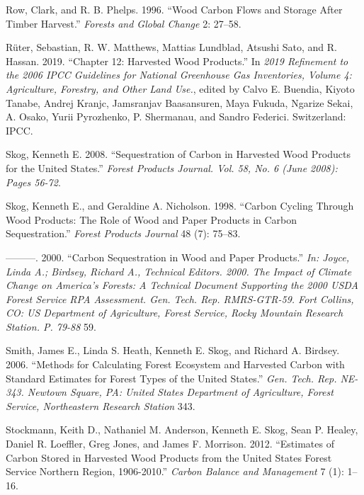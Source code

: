 \documentclass[
  openany]{book}
\newlength{\cslhangindent}
\newlength{\cslentryspacingunit} %
\newenvironment{CSLReferences}[2] %
 {%
  \setlength{\parindent}{0pt}
  \ifodd #1
  \let\oldpar\par
  \def\par{\hangindent=\cslhangindent\oldpar}
  \fi
  \setlength{\parskip}{#2\cslentryspacingunit}
 }%
 {}
\begin{document}
\begin{CSLReferences}{1}{0}
\leavevmode{}%
Row, Clark, and R. B. Phelps. 1996. {``Wood Carbon Flows and Storage
After Timber Harvest.''} \emph{Forests and Global Change} 2: 27--58.

\leavevmode{}%
Rüter, Sebastian, R. W. Matthews, Mattias Lundblad, Atsushi Sato, and R.
Hassan. 2019. {``Chapter 12: Harvested Wood Products.''} In \emph{2019
Refinement to the 2006 IPCC Guidelines for National Greenhouse Gas
Inventories, Volume 4: Agriculture, Forestry, and Other Land Use.},
edited by Calvo E. Buendia, Kiyoto Tanabe, Andrej Kranjc, Jamsranjav
Baasansuren, Maya Fukuda, Ngarize Sekai, A. Osako, Yurii Pyrozhenko, P.
Shermanau, and Sandro Federici. Switzerland: IPCC.

\leavevmode{}%
Skog, Kenneth E. 2008. {``Sequestration of Carbon in Harvested Wood
Products for the United States.''} \emph{Forest Products Journal. Vol.
58, No. 6 (June 2008): Pages 56-72}.

\leavevmode{}%
Skog, Kenneth E., and Geraldine A. Nicholson. 1998. {``Carbon Cycling
Through Wood Products: The Role of Wood and Paper Products in Carbon
Sequestration.''} \emph{Forest Products Journal} 48 (7): 75--83.

\leavevmode{}%
---------. 2000. {``Carbon Sequestration in Wood and Paper Products.''}
\emph{In: Joyce, Linda A.; Birdsey, Richard A., Technical Editors. 2000.
The Impact of Climate Change on America's Forests: A Technical Document
Supporting the 2000 USDA Forest Service RPA Assessment. Gen. Tech. Rep.
RMRS-GTR-59. Fort Collins, CO: US Department of Agriculture, Forest
Service, Rocky Mountain Research Station. P. 79-88} 59.

\leavevmode{}%
Smith, James E., Linda S. Heath, Kenneth E. Skog, and Richard A.
Birdsey. 2006. {``Methods for Calculating Forest Ecosystem and Harvested
Carbon with Standard Estimates for Forest Types of the United States.''}
\emph{Gen. Tech. Rep. NE-343. Newtown Square, PA: United States
Department of Agriculture, Forest Service, Northeastern Research
Station} 343.

\leavevmode{}%
Stockmann, Keith D., Nathaniel M. Anderson, Kenneth E. Skog, Sean P.
Healey, Daniel R. Loeffler, Greg Jones, and James F. Morrison. 2012.
{``Estimates of Carbon Stored in Harvested Wood Products from the United
States Forest Service Northern Region, 1906-2010.''} \emph{Carbon
Balance and Management} 7 (1): 1--16.


\end{CSLReferences}
\end{document}

